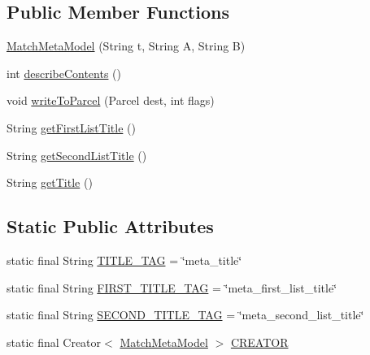 \subsection*{Public Member Functions}
\begin{DoxyCompactItemize}
\item 
\hyperlink{classorg_1_1buildmlearn_1_1toolkit_1_1matchtemplate_1_1data_1_1MatchMetaModel_a6090e69d89fffb96d2914e005c06210a}{Match\+Meta\+Model} (String t, String A, String B)
\item 
int \hyperlink{classorg_1_1buildmlearn_1_1toolkit_1_1matchtemplate_1_1data_1_1MatchMetaModel_a671ed968f126e92ad85680903768ee8e}{describe\+Contents} ()
\item 
void \hyperlink{classorg_1_1buildmlearn_1_1toolkit_1_1matchtemplate_1_1data_1_1MatchMetaModel_a238fff5d1fa11aab9000b2781a0f3946}{write\+To\+Parcel} (Parcel dest, int flags)
\item 
String \hyperlink{classorg_1_1buildmlearn_1_1toolkit_1_1matchtemplate_1_1data_1_1MatchMetaModel_a143deaa0476cbf9260ace76e804367bc}{get\+First\+List\+Title} ()
\item 
String \hyperlink{classorg_1_1buildmlearn_1_1toolkit_1_1matchtemplate_1_1data_1_1MatchMetaModel_ae073308f9cc23503ae3b08c76fbe648e}{get\+Second\+List\+Title} ()
\item 
String \hyperlink{classorg_1_1buildmlearn_1_1toolkit_1_1matchtemplate_1_1data_1_1MatchMetaModel_a43c3e92b6558e5d5f4912cff6b3749fe}{get\+Title} ()
\end{DoxyCompactItemize}
\subsection*{Static Public Attributes}
\begin{DoxyCompactItemize}
\item 
static final String \hyperlink{classorg_1_1buildmlearn_1_1toolkit_1_1matchtemplate_1_1data_1_1MatchMetaModel_a62d5c2b9c215bbcbac19b3a0dd1e52f5}{T\+I\+T\+L\+E\+\_\+\+T\+AG} = \char`\"{}meta\+\_\+title\char`\"{}
\item 
static final String \hyperlink{classorg_1_1buildmlearn_1_1toolkit_1_1matchtemplate_1_1data_1_1MatchMetaModel_abd6859183c166a177fa7cd2598f5e736}{F\+I\+R\+S\+T\+\_\+\+T\+I\+T\+L\+E\+\_\+\+T\+AG} = \char`\"{}meta\+\_\+first\+\_\+list\+\_\+title\char`\"{}
\item 
static final String \hyperlink{classorg_1_1buildmlearn_1_1toolkit_1_1matchtemplate_1_1data_1_1MatchMetaModel_a49d70b470033659a262090b3f640f0a9}{S\+E\+C\+O\+N\+D\+\_\+\+T\+I\+T\+L\+E\+\_\+\+T\+AG} = \char`\"{}meta\+\_\+second\+\_\+list\+\_\+title\char`\"{}
\item 
static final Creator$<$ \hyperlink{classorg_1_1buildmlearn_1_1toolkit_1_1matchtemplate_1_1data_1_1MatchMetaModel}{Match\+Meta\+Model} $>$ \hyperlink{classorg_1_1buildmlearn_1_1toolkit_1_1matchtemplate_1_1data_1_1MatchMetaModel_a32398334ccbf1ac8777e087fa31f720a}{C\+R\+E\+A\+T\+OR}
\end{DoxyCompactItemize}
